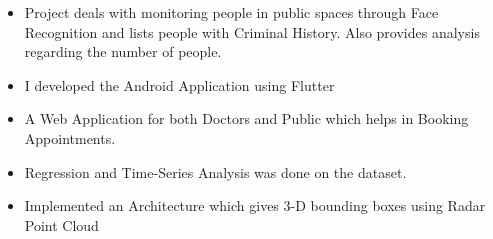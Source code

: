 \documentclass[10pt,a4paper,ragged2e,withhyper]{altacv}
\begin{document}
\begin{paracol}{2}
\medskip




\divider


\divider

\divider


\begin{itemize}
\item Project deals with monitoring people in public spaces through Face Recognition and lists  people with Criminal History. Also provides analysis regarding the number of people.
\end{itemize}
\begin{itemize}
\item I developed the Android Application using Flutter
\end{itemize}

\divider

\begin{itemize}
\item A Web Application for both Doctors and Public which helps in Booking Appointments.
\end{itemize}

\divider
{}
\begin{itemize}
\item Regression and Time-Series Analysis was done on the dataset.
\end{itemize}
\divider
{}
\begin{itemize}
\item Implemented an Architecture which gives 3-D bounding boxes using Radar Point Cloud
\end{itemize}



\end{paracol}
\end{document}
